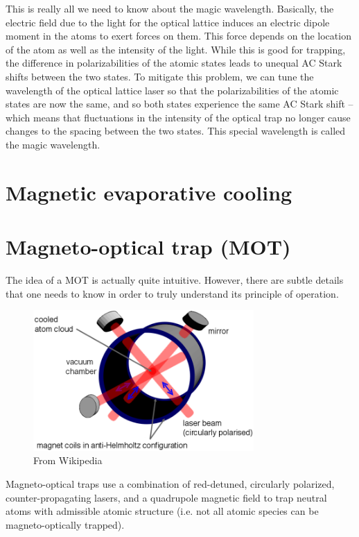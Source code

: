 \documentclass{book}
\theoremstyle{definition}
\begin{document}
This is really all we need to know about the magic wavelength. Basically, the electric field due to the light for the optical lattice induces an electric dipole moment in the atoms to exert forces on them. This force depends on the location of the atom as well as the intensity of the light. While this is good for trapping, the difference in polarizabilities of the atomic states leads to unequal AC Stark shifts between the two states. To mitigate this problem, we can tune the wavelength of the optical lattice laser so that the polarizabilities of the atomic states are now the same, and so both states experience the same AC Stark shift -- which means that fluctuations in the intensity of the optical trap no longer cause changes to the spacing between the two states. This special wavelength is called the magic wavelength. 



\section*{Magnetic evaporative cooling}






\section*{Magneto-optical trap (MOT)}

The idea of a MOT is actually quite intuitive. However, there are subtle details that one needs to know in order to truly understand its principle of operation. 

\begin{figure}[!htb]
	\centering
	\includegraphics[width=0.75\textwidth]{images/MOT}
	\caption{From Wikipedia}
\end{figure}

Magneto-optical traps use a combination of red-detuned, circularly polarized, counter-propagating lasers, and a quadrupole magnetic field to trap neutral atoms with admissible atomic structure (i.e. not all atomic species can be magneto-optically trapped). \\
\end{document}
